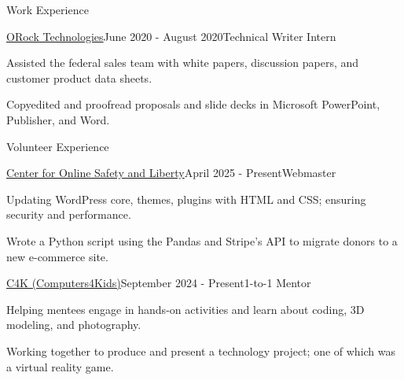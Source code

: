 \documentclass[11pt]{resume} %
\begin{document}
\begin{rSection}{Work Experience}

    	\begin{rSubsection}{\href{https://orocktech.com/}{ORock Technologies}}{June 2020 - August 2020}{Technical Writer Intern}{}\small
		\item Assisted the federal sales team with white papers, discussion papers, and customer product data sheets.
		\item Copyedited and proofread proposals and slide decks in Microsoft PowerPoint, Publisher, and Word.
	\end{rSubsection}

\end{rSection}


\begin{rSection}{Volunteer Experience}

	\begin{rSubsection}{\href{https://c4osl.org/}{Center for Online Safety and Liberty}}{April 2025 - Present}{Webmaster}{}\small
		\item Updating WordPress core, themes, plugins with HTML and CSS; ensuring security and performance.
		\item Wrote a Python script using the Pandas and Stripe's API to migrate donors to a new e-commerce site.
	\end{rSubsection}
    

	\begin{rSubsection}{\href{https://c4kclubhouse.org/}{C4K (Computers4Kids)}}{September 2024 - Present}{1-to-1 Mentor}{}\small
		\item Helping mentees engage in hands-on activities and learn about coding, 3D modeling, and photography.
		\item Working together to produce and present a technology project; one of which was a virtual reality game.
	\end{rSubsection}
\end{rSection}

\end{document}
